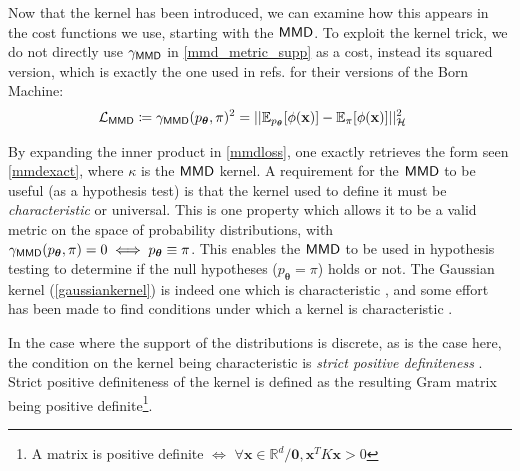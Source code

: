 Now that the kernel has been introduced, we can examine how this appears in the cost functions we use, starting with the $\operatorname{\textsf{MMD}}$. To exploit the kernel trick, we do not directly use $\gamma_{\operatorname{\textsf{MMD}}}$ in \eqref{mmd_metric_supp} as a cost, instead its squared version, which is exactly the one used in refs. for their versions of the Born Machine:
\begin{align}
    \mathcal{L}_{\operatorname{\textsf{MMD}}} &  \coloneqq \gamma_{\operatorname{\textsf{MMD}}}(p_{\boldsymbol\theta}, \pi)^2 = ||\mathbb{E}_{p_{\boldsymbol\theta}}[\phi(\mathbf{x})] - \mathbb{E}_{\pi}[\phi(\mathbf{x})]||_{\mathcal{H}}^2 \label{mmdloss}
\end{align}


By expanding the inner product in \eqref{mmdloss}, one exactly retrieves the form seen \eqref{mmdexact}, where $\kappa$ is the $\operatorname{\textsf{MMD}}$ kernel. A requirement for the $\operatorname{\textsf{MMD}}$ to be useful (as a hypothesis test) is that the kernel used to define it must be \textit{characteristic} or universal. This is one property which allows it to be a valid metric on the space of probability distributions, with $\gamma_{\operatorname{\textsf{MMD}}}(p_{\boldsymbol\theta}, \pi) = 0 \iff p_{\boldsymbol\theta} \equiv \pi$. This enables the $\operatorname{\textsf{MMD}}$ to be used in hypothesis testing to determine if the null hypotheses ($p_{\boldsymbol\theta} = \pi$) holds or not. The Gaussian kernel (\eqref{gaussiankernel}) is indeed one which is characteristic , and some effort has been made to find conditions under which a kernel is characteristic .

In the case where the support of the distributions is discrete, as is the case here, the condition on the kernel being characteristic is \textit{strict positive definiteness} . Strict positive definiteness of the kernel is defined as the resulting Gram matrix being positive definite\footnote{A matrix is positive definite $\iff$ $\forall \mathbf{x} \in \mathbb{R}^d/\mathbf{0}, \mathbf{x}^TK\mathbf{x} > 0$}. 

